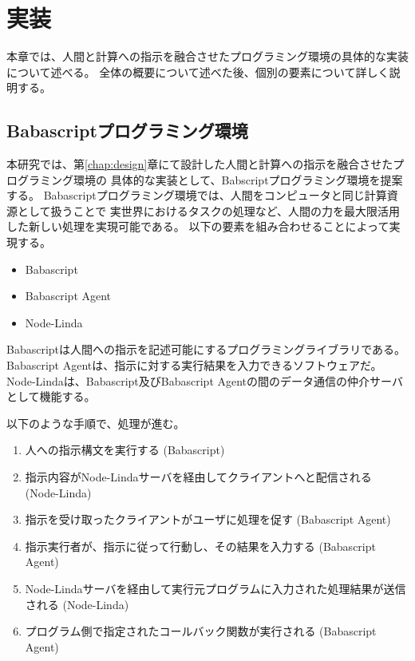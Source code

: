 \chapter{実装}\label{chap:implementation}

本章では、人間と計算への指示を融合させたプログラミング環境の具体的な実装について述べる。
全体の概要について述べた後、個別の要素について詳しく説明する。

\section{Babascriptプログラミング環境}\label{babascriptux30d7ux30edux30b0ux30e9ux30dfux30f3ux30b0ux74b0ux5883}

本研究では、第\ref{chap:design}章にて設計した人間と計算への指示を融合させたプログラミング環境の
具体的な実装として、Babscriptプログラミング環境を提案する。
Babascriptプログラミング環境では、人間をコンピュータと同じ計算資源として扱うことで
実世界におけるタスクの処理など、人間の力を最大限活用した新しい処理を実現可能である。
以下の要素を組み合わせることによって実現する。

\begin{itemize}
\itemsep1pt\parskip0pt
\item
  Babascript
\item
  Babascript Agent
\item
  Node-Linda
\end{itemize}

Babascriptは人間への指示を記述可能にするプログラミングライブラリである。
Babascript Agentは、指示に対する実行結果を入力できるソフトウェアだ。
Node-Lindaは、Babascript及びBabascript
Agentの間のデータ通信の仲介サーバとして機能する。

以下のような手順で、処理が進む。

\begin{enumerate}
\def\labelenumi{\arabic{enumi}.}
\itemsep1pt\parskip0pt
\item
  人への指示構文を実行する (Babascript)
\item
  指示内容がNode-Lindaサーバを経由してクライアントへと配信される
  (Node-Linda)
\item
  指示を受け取ったクライアントがユーザに処理を促す (Babascript Agent)
\item
  指示実行者が、指示に従って行動し、その結果を入力する (Babascript
  Agent)
\item
  Node-Lindaサーバを経由して実行元プログラムに入力された処理結果が送信される
  (Node-Linda)
\item
  プログラム側で指定されたコールバック関数が実行される (Babascript
  Agent)
\end{enumerate}

